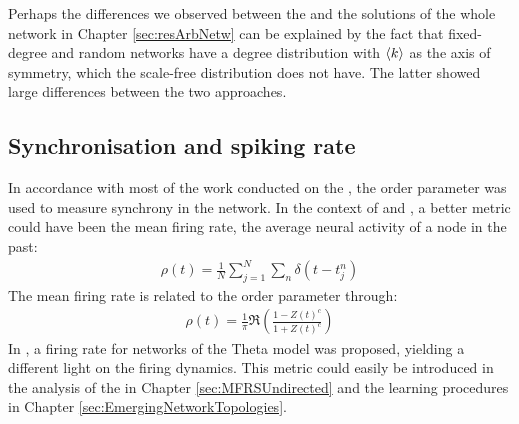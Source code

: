 Perhaps the differences we observed between the \MFR and the solutions of the whole network in Chapter \ref{sec:resArbNetw} can be explained by the fact that fixed-degree and random networks have a degree distribution with ${\langle k\rangle}$ as the axis of symmetry, which the scale-free distribution does not have. The latter showed large differences between the two approaches.


\subsection{Synchronisation and spiking rate}
In accordance with most of the work conducted on the \MFR, the order parameter was used to measure synchrony in the network. In the context of \STDP and \IP, a better metric could have been the mean firing rate, the average neural activity of a node in the past:
\begin{align}
\rho(t)=\frac{1}{N} \sum_{j=1}^{N} \sum_{n} \delta\left(t-t_{j}^{n}\right)
\end{align}
The mean firing rate is related to the order parameter through:
\begin{align}
\rho(t) = \frac{1}{\pi} \Re \left(\frac{1-Z(t)^c}{1+Z(t)^c}\right)
\end{align}
In \cite{Montbrio2015}, a firing rate \MFR for networks of the Theta model was proposed, yielding a different light on the firing dynamics. This metric could easily be introduced in the analysis of the \MFR in Chapter \ref{sec:MFRSUndirected} and the learning procedures in Chapter \ref{sec:EmergingNetworkTopologies}.




